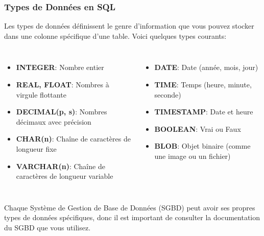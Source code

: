 \begin{frame}
  \frametitle{Types de Données en SQL}

  Les types de données définissent le genre d'information que vous pouvez stocker dans une colonne spécifique d'une table. Voici quelques types courants:

  \begin{columns}
    \begin{itemize}
      \item \textbf{INTEGER}: Nombre entier
      \item \textbf{REAL, FLOAT}: Nombres à virgule flottante
      \item \textbf{DECIMAL(p, s)}: Nombres décimaux avec précision
      \item \textbf{CHAR(n)}: Chaîne de caractères de longueur fixe
      \item \textbf{VARCHAR(n)}: Chaîne de caractères de longueur variable
    \end{itemize}

    \begin{itemize}
      \item \textbf{DATE}: Date (année, mois, jour)
      \item \textbf{TIME}: Temps (heure, minute, seconde)
      \item \textbf{TIMESTAMP}: Date et heure
      \item \textbf{BOOLEAN}: Vrai ou Faux
      \item \textbf{BLOB}: Objet binaire (comme une image ou un fichier)
    \end{itemize}
  \end{columns}

  \vspace{0.25cm}
  \small
  Chaque Système de Gestion de Base de Données (SGBD) peut avoir ses propres types de données spécifiques, donc il est important de consulter la documentation du SGBD que vous utilisez.

\end{frame}

